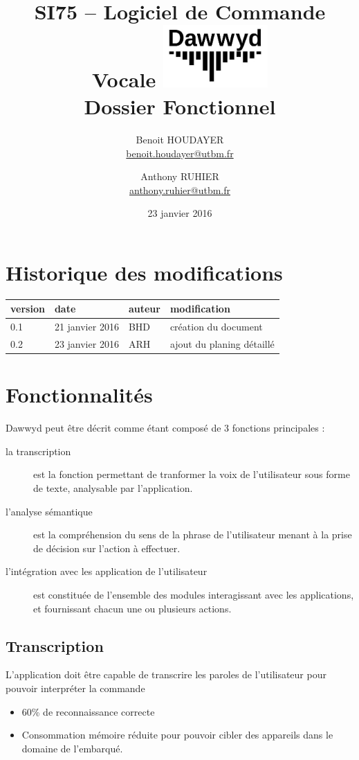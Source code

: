 \documentclass[12pt]{article}
\title{\vspace{-1cm}\textbf{SI75 -- Logiciel de Commande Vocale \includegraphics[width=4cm]{logo.jpg}\\[0.5em]Dossier Fonctionnel}}
\author{Benoit HOUDAYER \\ \href{mailto:benoit.houdayer@utbm.fr}{benoit.houdayer@utbm.fr}
\and Anthony RUHIER \\ \href{mailto:anthony.ruhier@utbm.fr}{anthony.ruhier@utbm.fr}}
\date{23 janvier 2016}
\begin{document}
    \maketitle
    \thispagestyle{empty}
    \tableofcontents
    \listoffigures

    \section*{Historique des modifications}

    \begin{table}[H]
    \centering

    \begin{tabular}{|l|l|l|l|}
        \hline
        version & date & auteur & modification \\
        \hline
        0.1 & 21 janvier 2016 & BHD & création du document \\
        0.2 & 23 janvier 2016 & ARH & ajout du planing détaillé \\
        \hline
    \end{tabular}
    \end{table}

    \afterpage{\cfoot{\thepage}}
    \newpage

    \section{Fonctionnalités}
    Dawwyd peut être décrit comme étant composé de 3 fonctions principales :
    \begin{description}
        \item[la transcription] est la fonction permettant de tranformer la voix
            de l'utilisateur sous forme de texte, analysable par l'application.
        \item[l'analyse sémantique] est la compréhension du sens de la phrase
            de l'utilisateur menant à la prise de décision sur
            l'action à effectuer.
        \item[l'intégration avec les application de l'utilisateur] est constituée
            de l'ensemble des modules interagissant avec les applications,
            et fournissant chacun une ou plusieurs actions.
    \end{description}

    \subsection{Transcription}
    L'application doit être capable de transcrire
    les paroles de l'utilisateur pour pouvoir interpréter la
    commande
    \begin{itemize}
        \item 60\% de reconnaissance correcte
        \item Consommation mémoire réduite pour pouvoir cibler des appareils
            dans le domaine de l'embarqué.
    \end{itemize}
\end{document}
